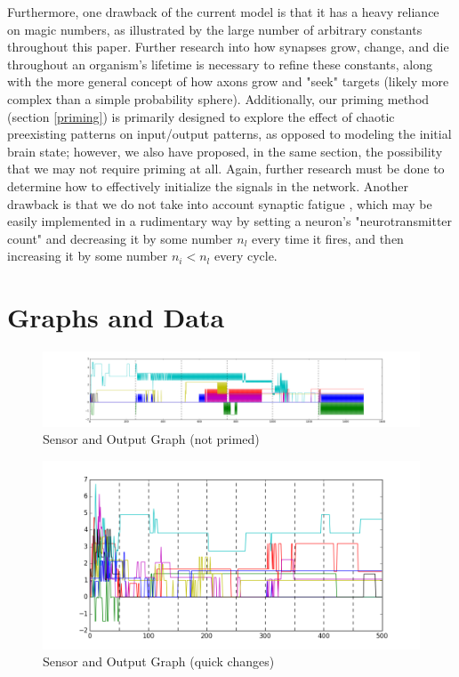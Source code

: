 \documentclass[12pt]{article}
\begin{document}
Furthermore, one drawback of the current model is that it has a heavy reliance on magic numbers, as illustrated by the large number of arbitrary constants throughout this paper.  Further research into how synapses grow, change, and die throughout an organism's lifetime is necessary to refine these constants, along with the more general concept of how axons grow and "seek" targets (likely more complex than a simple probability sphere).  Additionally, our priming method (section \ref{priming}) is primarily designed to explore the effect of chaotic preexisting patterns on input/output patterns, as opposed to modeling the initial brain state; however, we also have proposed, in the same section, the possibility that we may not require priming at all.  Again, further research must be done to determine how to effectively initialize the signals in the network.  Another drawback is that we do not take into account synaptic fatigue \cite{synapticfatigue}, which may be easily implemented in a rudimentary way by setting a neuron's "neurotransmitter count" and decreasing it by some number $n_l$ every time it fires, and then increasing it by some number $n_i < n_l$ every cycle.


\newpage

\section{Graphs and Data} \label{graphs}

\begin{figure}[H]
    \centering
    \includegraphics[width=\textheight,angle=270,keepaspectratio]{../visualizations/8knodes_unrandomized.png}
    \caption{Sensor and Output Graph (not primed)}
\end{figure}

\begin{figure}[H]
    \centering
    \includegraphics[width=\textheight,angle=270,keepaspectratio]{../visualizations/8knodes_quick_changes.png}
    \caption{Sensor and Output Graph (quick changes)}
\end{figure}
\end{document}
